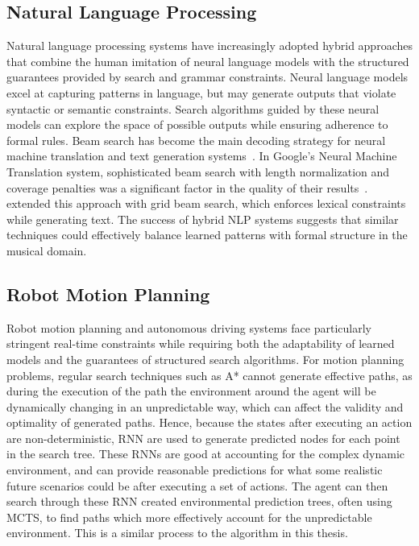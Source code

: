 \subsection{Natural Language Processing}
Natural language processing systems have increasingly adopted hybrid approaches that combine the human imitation of neural language models with the structured guarantees provided by search and grammar constraints. Neural language models excel at capturing patterns in language, but may generate outputs that violate syntactic or semantic constraints. Search algorithms guided by these neural models can explore the space of possible outputs while ensuring adherence to formal rules. Beam search has become the main decoding strategy for neural machine translation and text generation systems~\citep{Sutskever2014Seq2Seq}. In Google's Neural Machine Translation system, sophisticated beam search with length normalization and coverage penalties was a significant factor in the quality of their results~\citep{Wu2016GoogleNMT}.~\cite{Hokamp2017GridBeamSearch} extended this approach with grid beam search, which enforces lexical constraints while generating text. The success of hybrid NLP systems suggests that similar techniques could effectively balance learned patterns with formal structure in the musical domain.

\subsection{Robot Motion Planning}
Robot motion planning and autonomous driving systems face particularly stringent real-time constraints while requiring both the adaptability of learned models and the guarantees of structured search algorithms. For motion planning problems, regular search techniques such as A* cannot generate effective paths, as during the execution of the path the environment around the agent will be dynamically changing in an unpredictable way, which can affect the validity and optimality of generated paths. Hence, because the states after executing an action are non-deterministic, RNN are used to generate predicted nodes for each point in the search tree. These RNNs are good at accounting for the complex dynamic environment, and can provide reasonable predictions for what some realistic future scenarios could be after executing a set of actions. The agent can then search through these RNN created environmental prediction trees, often using MCTS, to find paths which more effectively account for the unpredictable environment. This is a similar process to the algorithm in this thesis.


